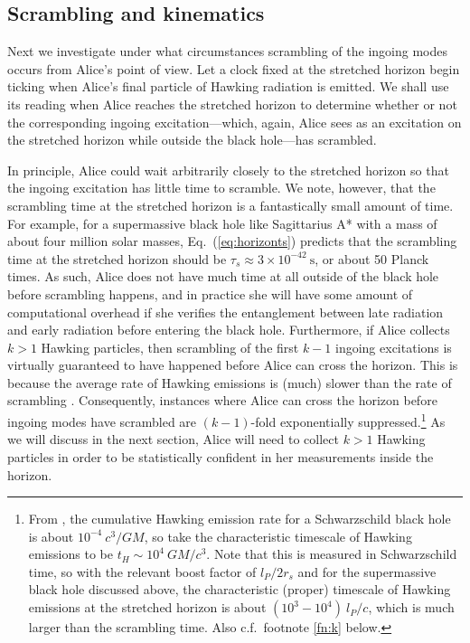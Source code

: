 \documentclass[a4paper,11pt]{article}
\theoremstyle{definition}
\newcommand{\Eq}[1]{Eq.~(\ref{#1})}
\begin{document}
\subsection{Scrambling and kinematics}\label{sub:kinematics}

Next we investigate under what circumstances scrambling of the ingoing modes occurs from Alice's point of view.
Let a clock fixed at the stretched horizon begin ticking when Alice's final particle of Hawking radiation is emitted.
We shall use its reading when Alice reaches the stretched horizon to determine whether or not the corresponding ingoing excitation---which, again, Alice sees as an excitation on the stretched horizon while outside the black hole---has scrambled.

In principle, Alice could wait arbitrarily closely to the stretched horizon so that the ingoing excitation has little time to scramble.
We note, however, that the scrambling time at the stretched horizon is a fantastically small amount of time.
For example, for a supermassive black hole like Sagittarius A* with a mass of about four million solar masses, \Eq{eq:horizonts} predicts that the scrambling time at the stretched horizon should be $\tau_s \approx 3 \times 10^{-42}~\mathrm{s}$, or about 50 Planck times.
As such, Alice does not have much time at all outside of the black hole before scrambling happens, and in practice she will have some amount of computational overhead if she verifies the entanglement between late radiation and early radiation before entering the black hole.
Furthermore, if Alice collects $k>1$ Hawking particles, then scrambling of the first $k-1$ ingoing excitations is virtually guaranteed to have happened before Alice can cross the horizon.
This is because the average rate of Hawking emissions is (much) slower than the rate of scrambling \cite{Page:1976a,Page:1976b}.
Consequently, instances where Alice can cross the horizon before ingoing modes have scrambled are $(k-1)$-fold exponentially suppressed.\footnote{From \cite{Page:1976a}, the cumulative Hawking emission rate for a Schwarzschild black hole is about $10^{-4}~c^3/GM$, so take the characteristic timescale of Hawking emissions to be $t_H \sim 10^4~GM/c^3$.
Note that this is measured in Schwarzschild time, so with the relevant boost factor of $l_P/2r_s$ and for the supermassive black hole discussed above, the characteristic (proper) timescale of Hawking emissions at the stretched horizon is about $(10^3- 10^4)~l_P/c$, which is much larger than the scrambling time.
Also c.f.\ footnote \ref{fn:k} below.}
As we will discuss in the next section, Alice will need to collect $k>1$ Hawking particles in order to be statistically confident in her measurements inside the horizon.
\end{document}
